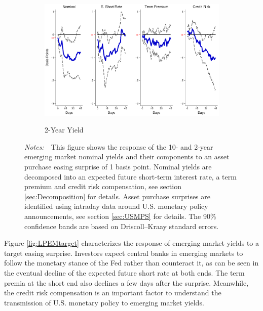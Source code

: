 \documentclass[a4paper, 12pt]{article}
\newcommand{\figtext}[1]{
	\vspace{-1ex}
	\captionsetup{justification=justified,font=footnotesize}
	\caption*{#1}
}
\newcommand{\fignotes}[1]{\figtext{\emph{Notes:~}~#1}}
\begin{document}
{\begin{landscape}
\begin{figure}[tbph]
\begin{center}
\begin{minipage}{\linewidth}
\begin{center}
						\begin{subfigure}[t]{\linewidth}
							\includegraphics[trim={0cm 0cm 0cm 0cm},clip,height=0.35\textheight,width=\linewidth]{../Figures/LSAPEMnomyptpphi24m.eps} \\
							\vspace{-0.35cm}
							\caption{2-Year Yield} \label{subfig:LPEM2Ylsap}
						\end{subfigure}
						\vspace{-0.45cm}
					\end{center}
					\fignotes{This figure shows the response of the 10- and 2-year emerging market nominal yields and their components to an asset purchase easing surprise of 1 basis point. Nominal yields are decomposed into an expected future short-term interest rate, a term premium and credit risk compensation, see section \ref{sec:Decomposition} for details. Asset purchase surprises are identified using intraday data around U.S. monetary policy announcements, see section \ref{sec:USMPS} for details. The 90\% confidence bands are based on Driscoll--Kraay standard errors.}
				\end{minipage}
			\end{center}
		\end{figure}
		
	\end{landscape}
}

Figure \ref{fig:LPEMtarget} characterizes the response of emerging market yields to a target easing surprise. Investors expect central banks in emerging markets to follow the monetary stance of the Fed rather than counteract it, as can be seen in the eventual decline of the expected future short rate at both ends. The term premia at the short end also declines a few days after the surprise. Meanwhile, the credit risk compensation is an important factor to understand the transmission of U.S. monetary policy to emerging market yields. 
\end{document}
